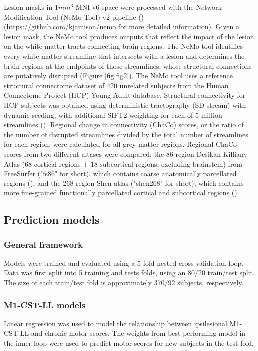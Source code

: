 \documentclass[10pt]{article}
\def\Plus{\texttt{+}}
\begin{document}
Lesion masks in $1mm^3$ MNI v6 space were processed with the Network Modification Tool (NeMo Tool) v2 pipeline (\cite{Kuceyeski2013-nk}) (https://github.com/kjamison/nemo for more detailed information). Given a lesion mask, the NeMo tool produces outputs that reflect the impact of the lesion on the white matter tracts connecting brain regions. The NeMo tool identifies every white matter streamline that intersects with a lesion and determines the brain regions at the endpoints of those streamlines, whose structural connections are putatively disrupted (Figure \ref{fig:fig2}). The NeMo tool uses a reference structural connectome dataset of 420 unrelated subjects from the Human Connectome Project (HCP) Young Adult database. Structural connectivity for HCP subjects was obtained using deterministic tractography (SD stream) with dynamic seeding, with additional SIFT2 weighting for each of 5 million streamlines (\cite{Smith2015-eb}). Regional change in connectivity (ChaCo) scores, or the ratio of the number of disrupted streamlines divided by the total number of streamlines for each region, were calculated for all grey matter regions. Regional ChaCo scores from two different altases were compared: the 86-region Desikan-Killiany Atlas (68 cortical regions $\Plus$ 18 subcortical regions, excluding brainstem) from FreeSurfer ("fs86" for short), which contains coarse anatomically parcellated regions (\cite{Desikan2006-vf,Fischl2002-lb}), and the 268-region Shen atlas ("shen268" for short), which contains more fine-grained functionally parcellated cortical and subcortical regions (\cite{Shen2013-zn}).


\subsection{Prediction models}
\subsubsection*{General framework}

Models were trained and evaluated using a 5-fold nested cross-validation loop. Data was first split into 5 training and tests folds, using an 80/20 train/test split. The size of each train/test fold is approximately 370/92 subjects, respectively. 

\subsubsection*{M1-CST-LL models}
Linear regression was used to model the relationship between ipsilesional M1-CST-LL and chronic motor scores. The weights from best-performing model in the inner loop were used to predict motor scores for new subjects in the test fold. 
\end{document}
